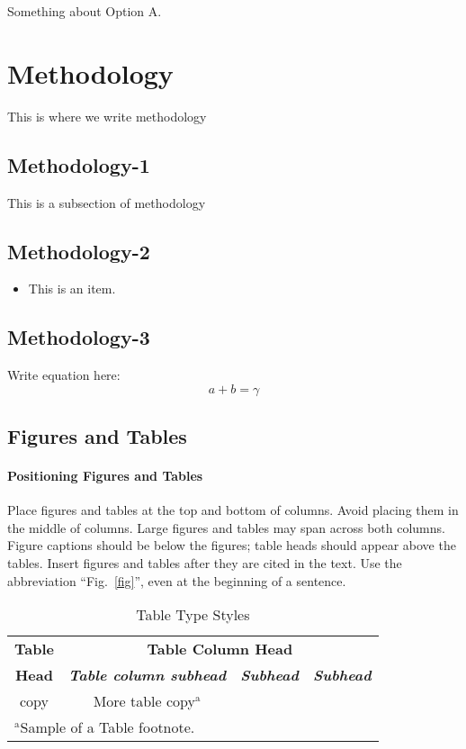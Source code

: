 \documentclass[conference]{IEEEtran}
\begin{document}
Something about Option A.

\section{Methodology}
This is where we write methodology

\subsection{Methodology-1}\label{AA}
This is a subsection of methodology 

\subsection{Methodology-2}
\begin{itemize}
\item This is an item.
\end{itemize}

\subsection{Methodology-3}
Write equation here:
\begin{equation}
a+b=\gamma\label{eq}
\end{equation}

\subsection{Figures and Tables}
\paragraph{Positioning Figures and Tables} Place figures and tables at the top and 
bottom of columns. Avoid placing them in the middle of columns. Large 
figures and tables may span across both columns. Figure captions should be 
below the figures; table heads should appear above the tables. Insert 
figures and tables after they are cited in the text. Use the abbreviation 
``Fig.~\ref{fig}'', even at the beginning of a sentence.

\begin{table}[htbp]
\caption{Table Type Styles}
\begin{center}
\begin{tabular}{|c|c|c|c|}
\hline
\textbf{Table}&\multicolumn{3}{|c|}{\textbf{Table Column Head}} \\
\cline{2-4} 
\textbf{Head} & \textbf{\textit{Table column subhead}}& \textbf{\textit{Subhead}}& \textbf{\textit{Subhead}} \\
\hline
copy& More table copy$^{\mathrm{a}}$& &  \\
\hline
\multicolumn{4}{l}{$^{\mathrm{a}}$Sample of a Table footnote.}
\end{tabular}
\label{tab1}
\end{center}
\end{table}
\end{document}
